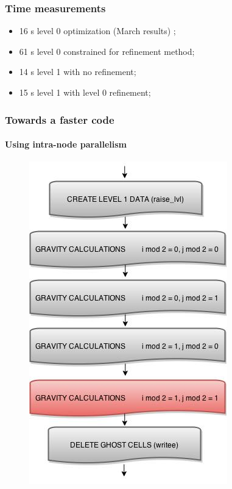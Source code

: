 \documentclass{beamer}
\begin{document}
\begin{frame}
\frametitle{Time measurements}


\begin{itemize}
\item 16 s  level 0 optimization (March results) ;
\item 61 s  level 0 constrained for refinement method;
\item 14 s  level 1 with no refinement;
\item 15 s  level 1 with level 0 refinement;  


\end{itemize}
\end{frame}

\begin{frame}
\frametitle{Towards a faster code}
\framesubtitle{Using intra-node parallelism}

\begin{figure}

\includegraphics[width = .4\textwidth]{./Grav_Diagram4.jpg}

\end{figure}


\end{frame}
\end{document}

